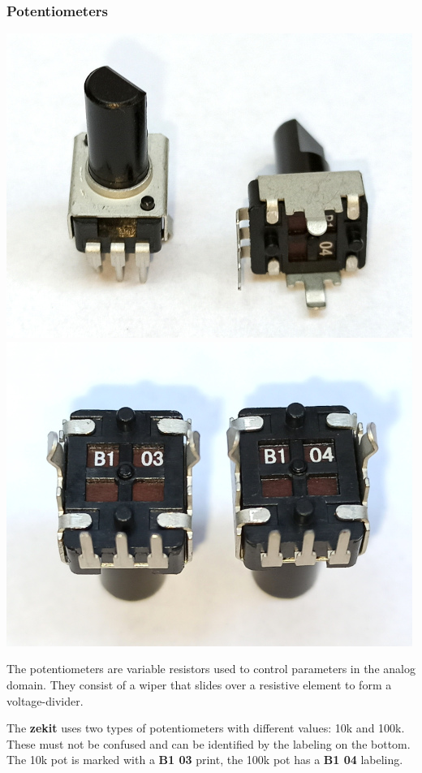 \documentclass{scrartcl}
\begin{document}
\subsubsection{Potentiometers}

\begin{center}
    \includegraphics[scale=0.5]{assets/zekit-pots1-resized.jpg}
    \includegraphics[scale=0.5]{assets/zekit-pots2-resized.jpg}
\end{center}

The potentiometers are variable resistors used to control parameters in the analog domain. They consist of a wiper that slides over a resistive element to form a voltage-divider.

The \textbf{zekit} uses two types of potentiometers with different values: 10k and 100k. These must not be confused and can be identified by the labeling on the bottom. The 10k pot is marked with a \textbf{B1 03} print, the 100k pot has a \textbf{B1 04} labeling.
\end{document}
